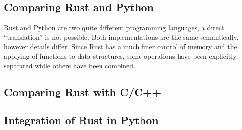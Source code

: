 


\subsection{Comparing Rust and Python}\label{sec:rustvspython}

Rust and Python are two quite different programming languages, a direct
``translation'' is not possible. Both implementations are the same semantically,
however details differ. Since Rust has a much finer control of memory and the
applying of functions to data structures, some operations have been explicitly
separated while others have been combined.

\subsection{Comparing Rust with C/C++}\label{sec:rustvscc++}







\subsection{Integration of Rust in Python}\label{sec:integration}


